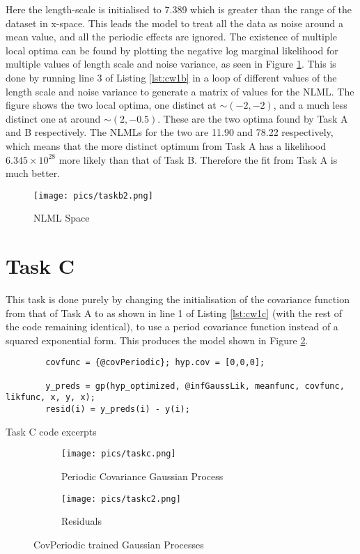 \documentclass[11pt]{amsart}
\begin{document}
Here the length-scale is initialised to 7.389 which is greater than the range of the dataset in x-space. This leads the model to treat all the data as noise around a mean value, and all the periodic effects are ignored. The existence of multiple local optima can be found by plotting the negative log marginal likelihood for multiple values of length scale and noise variance, as seen in Figure \ref{fig:taskb2}. This is done by running line 3 of Listing \ref{lst:cw1b} in a loop of different values of the length scale and noise variance to generate a matrix of values for the NLML. The figure shows the two local optima, one distinct at $\sim(-2, -2)$, and a much less distinct one at around $\sim(2, -0.5)$. These are the two optima found by Task A and B respectively. The NLMLs for the two are 11.90 and 78.22 respectively, which means that the more distinct optimum from Task A has a likelihood $6.345\times10^{28}$ more likely than that of Task B. Therefore the fit from Task A is much better. 

\begin{figure}[]
    \centering
    \texttt{[image: pics/taskb2.png]}
    \caption{NLML Space}
    \label{fig:taskb2}
\end{figure}

\section{Task C}
This task is done purely by changing the initialisation of the covariance function from that of Task A to as shown in line 1 of Listing \ref{lst:cw1c} (with the rest of the code remaining identical), to use a period covariance function instead of a squared exponential form. This produces the model shown in Figure \ref{fig:taskc}. 


\begin{listing}[H]
    \begin{verbatim}
        covfunc = {@covPeriodic}; hyp.cov = [0,0,0];

        y_preds = gp(hyp_optimized, @infGaussLik, meanfunc, covfunc, likfunc, x, y, x);
        resid(i) = y_preds(i) - y(i);
    \end{verbatim}
    \caption{Task C code excerpts} \label{lst:cw1c}
\end{listing}

\begin{figure}[ht]
    \centering
    \begin{subfigure}[b]{0.65\textwidth}
        \centering
        \texttt{[image: pics/taskc.png]}
        \caption{Periodic Covariance Gaussian Process}
        \label{fig:taskc}
    \end{subfigure}
    \hfill
    \begin{subfigure}[b]{0.34\textwidth}
        \centering
        \texttt{[image: pics/taskc2.png]}
        \caption{Residuals}
        \label{fig:taskc2}
    \end{subfigure}
    \caption{CovPeriodic trained Gaussian Processes}
\end{figure} \label{fig:taskcall}
\end{document}
